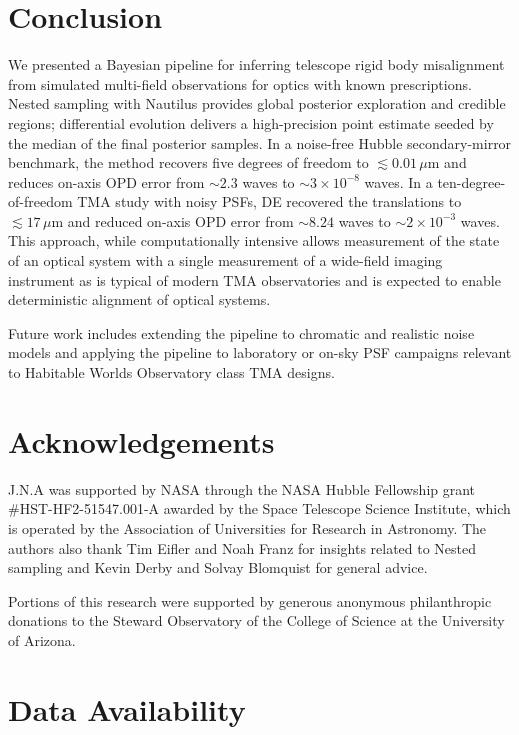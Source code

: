 \documentclass[fleqn,usenatbib]{rasti}
\begin{document}
\section{Conclusion}

We presented a Bayesian pipeline for inferring telescope rigid body misalignment from simulated multi-field observations for optics with known prescriptions. Nested sampling with Nautilus provides global posterior exploration and credible regions; differential evolution delivers a high-precision point estimate seeded by the median of the final posterior samples. In a noise-free Hubble secondary-mirror benchmark, the method recovers five degrees of freedom to $\lesssim 0.01\,\mu\mathrm{m}$ and reduces on-axis OPD error from $\sim 2.3$ waves to $\sim 3\times 10^{-8}$ waves. In a ten-degree-of-freedom TMA study with noisy PSFs, DE recovered the translations to $\lesssim 17\,\mu\mathrm{m}$ and reduced on-axis OPD error from $\sim 8.24$ waves to $\sim 2\times 10^{-3}$ waves. This approach, while computationally intensive allows measurement of the state of an optical system with a single measurement of a wide-field imaging instrument as is typical of modern TMA observatories  and is expected to enable deterministic alignment of optical systems.

Future work includes extending the pipeline to chromatic and realistic noise models and applying the pipeline to laboratory or on-sky PSF campaigns relevant to Habitable Worlds Observatory class TMA designs.


\section*{Acknowledgements}

J.N.A was supported by NASA through the NASA Hubble Fellowship grant \#HST-HF2-51547.001-A awarded by the Space Telescope Science Institute, which is operated by the Association of Universities for Research in Astronomy. The authors also thank Tim Eifler and Noah Franz for insights related to Nested sampling and Kevin Derby and Solvay Blomquist for general advice. 

Portions of this research were supported by generous anonymous philanthropic donations to the Steward Observatory of the College of Science at the University of Arizona.
\section*{Data Availability}
\end{document}
